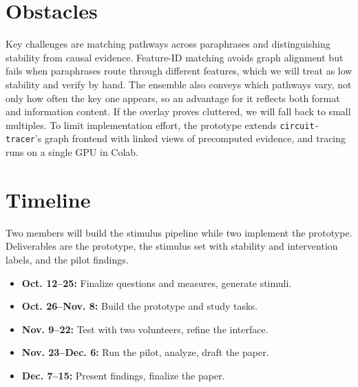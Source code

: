 \documentclass[sigconf,balance=false]{acmart}
\begin{document}
\section{Obstacles}
Key challenges are matching pathways across paraphrases and distinguishing stability from causal evidence. Feature-ID matching avoids graph alignment but fails when paraphrases route through different features, which we will treat as low stability and verify by hand. The ensemble also conveys which pathways vary, not only how often the key one appears, so an advantage for it reflects both format and information content. If the overlay proves cluttered, we will fall back to small multiples. To limit implementation effort, the prototype extends \texttt{circuit-tracer}'s graph frontend with linked views of precomputed evidence, and tracing runs on a single GPU in Colab.




\section{Timeline}
Two members will build the stimulus pipeline while two implement the prototype. Deliverables are the prototype, the stimulus set with stability and intervention labels, and the pilot findings.
\begin{itemize}
\setlength{\itemsep}{0pt}\setlength{\parskip}{0pt}\setlength{\topsep}{2pt}
\item \textbf{Oct. 12--25:} Finalize questions and measures, generate stimuli.
\item \textbf{Oct. 26--Nov. 8:} Build the prototype and study tasks.
\item \textbf{Nov. 9--22:} Test with two volunteers, refine the interface.
\item \textbf{Nov. 23--Dec. 6:} Run the pilot, analyze, draft the paper.
\item \textbf{Dec. 7--15:} Present findings, finalize the paper.
\end{itemize}




\clearpage


\end{document}
